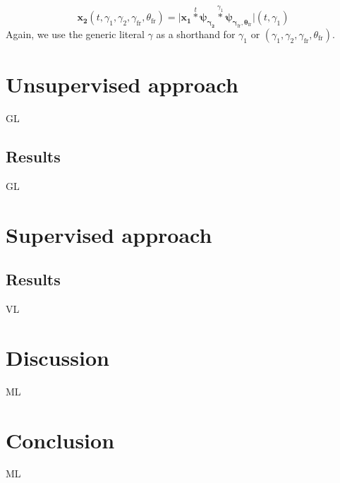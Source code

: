 \documentclass[journal]{IEEEtran}
\begin{document}
\begin{equation}
\boldsymbol{x_2}(t,\gamma_1,\gamma_2,\gamma_{\mathrm{fr}},\theta_{\mathrm{fr}}) =
\vert \boldsymbol{x_1}
\overset{t}{\ast} \boldsymbol{\psi_{\gamma_2}}
\overset{\gamma_1}{\ast} \boldsymbol{\psi_{\gamma_{\mathrm{fr}}, \theta_{\mathrm{fr}}}}
\vert (t,\gamma_1)
\end{equation}
Again, we use the generic literal $\gamma$ as a shorthand for $\gamma_1$ or $(\gamma_1, \gamma_2, \gamma_{\mathrm{fr}}, \theta_{\mathrm{fr}})$.

\section{Unsupervised approach}

GL

\subsection{Results}

GL

\section{Supervised approach}

\subsection{Results}

VL

\section{Discussion}

ML

\section{Conclusion}

ML




% 
\end{document}
